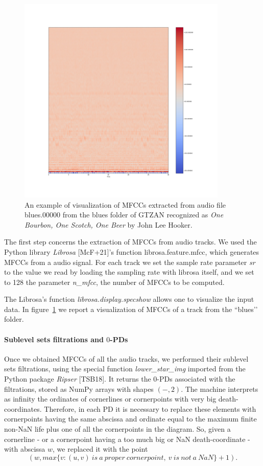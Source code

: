 \documentclass[english, LaM, oneside, noexaminfo]{sapthesis}
\begin{document}
\begin{figure}[tb]
\centering
\includegraphics[height=10cm]{testplot.jpg}
\caption{An example of visualization of MFCCs extracted from audio file blues.00000 from the blues folder of GTZAN recognized as \textit{One Bourbon, One Scotch, One Beer} by John Lee Hooker.}\label{fig:MFCCs_plot}
\end{figure}

The first step concerns the extraction of MFCCs from audio tracks. We used the Python library \textit{Librosa} [McF+21]’s function librosa.feature.mfcc, which generates MFCCs from a audio signal. For each track we set the sample rate parameter \textit{sr} to the value we read by loading the sampling rate with librosa itself, and we set to 128 the parameter \textit{n\_mfcc}, the number of MFCCs to be computed. 

The Librosa’s function \textit{librosa.display.specshow} allows one to visualize the input data. In figure~\ref{fig:MFCCs_plot} we report a visualization of MFCCs of a track from the ``blues’’ folder. 

\paragraph{Sublevel sets filtrations and $0$-PDs}
Once we obtained MFCCs of all the audio tracks, we performed their sublevel sets filtrations, using the special function \textit{lower\_star\_img} imported from the Python package \textit{Ripser} [TSB18]. It returns the $0$-PDs associated with the filtrations, stored as NumPy arrays with shapes $(-,2)$.
The machine interprets as infinity the ordinates of cornerlines or cornerpoints with very big death-coordinates. Therefore, in each PD it is necessary to replace these elements with cornerpoints having the same abscissa and ordinate equal to the maximum finite non-NaN life plus one of all the cornerpoints in the diagram. So, given a cornerline - or a cornerpoint having a too much big or NaN death-coordinate - with abscissa $w$, we replaced it with the point $$(w, max \{v : (u, v) \ is \ a \ proper \ cornerpoint,\ v \ is\ not\ a\ NaN\}+1).$$
\end{document}
